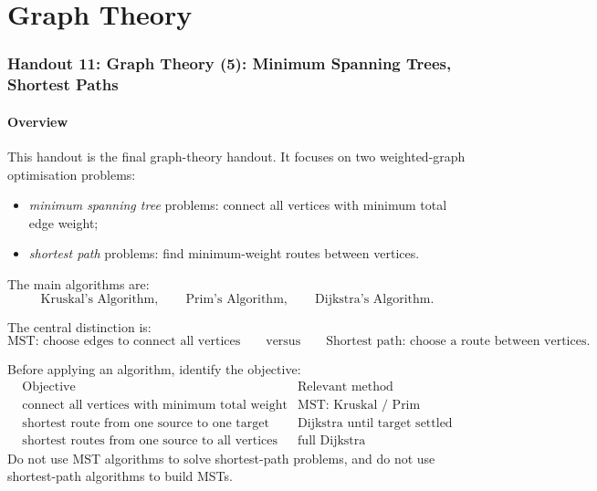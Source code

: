 \part{Graph Theory}
\section{Handout 11: Graph Theory (5): Minimum Spanning Trees, Shortest Paths}

\subsection{Overview}

This handout is the final graph-theory handout. It focuses on two weighted-graph optimisation problems:
\begin{itemize}[leftmargin=*]
    \item \emph{minimum spanning tree} problems: connect all vertices with minimum total edge weight;
    \item \emph{shortest path} problems: find minimum-weight routes between vertices.
\end{itemize}

The main algorithms are:
\[
\text{Kruskal's Algorithm},
\qquad
\text{Prim's Algorithm},
\qquad
\text{Dijkstra's Algorithm}.
\]

The central distinction is:
\[
\text{MST: choose edges to connect all vertices}
\qquad\text{versus}\qquad
\text{Shortest path: choose a route between vertices}.
\]

\begin{examtip}[title={Main diagnostic for Handout 11}]
Before applying an algorithm, identify the objective:
\[
\begin{array}{c|c}
\text{Objective} & \text{Relevant method} \\ \hline
\text{connect all vertices with minimum total weight} & \text{MST: Kruskal / Prim} \\
\text{shortest route from one source to one target} & \text{Dijkstra until target settled} \\
\text{shortest routes from one source to all vertices} & \text{full Dijkstra}
\end{array}
\]
Do not use MST algorithms to solve shortest-path problems, and do not use shortest-path algorithms to build MSTs.
\end{examtip}

